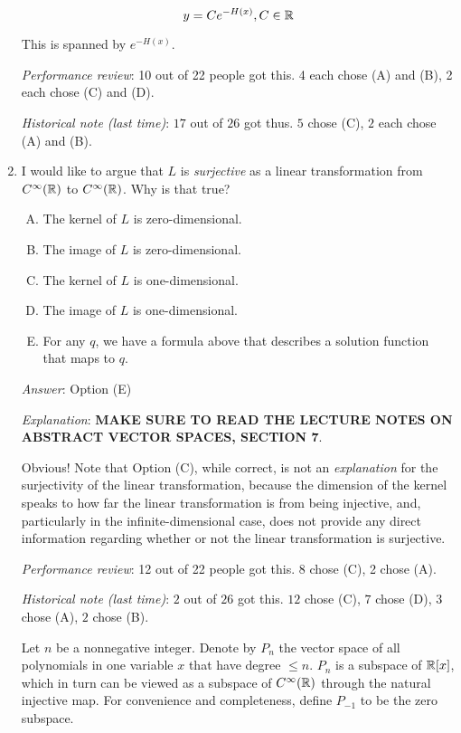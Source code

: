\documentclass[10pt]{amsart}
\begin{document}
\begin{enumerate}
  $$y = Ce^{-H(x)}, C \in \mathbb{R}$$

  This is spanned by $e^{-H(x)}$.

  {\em Performance review}: 10 out of 22 people got this. 4 each
  chose (A) and (B), 2 each chose (C) and (D).

  {\em Historical note (last time)}: $17$ out of $26$ got thus. $5$ chose (C),
  $2$ each chose (A) and (B).

\item I would like to argue that $L$ is {\em surjective} as a linear
  transformation from $C^\infty(\mathbb{R})$ to $C^\infty(\mathbb{R})$. Why is that
  true?

  \begin{enumerate}[(A)]
  \item The kernel of $L$ is zero-dimensional.
  \item The image of $L$ is zero-dimensional.
  \item The kernel of $L$ is one-dimensional.
  \item The image of $L$ is one-dimensional.
  \item For any $q$, we have a formula above that describes a solution
    function that maps to $q$.
  \end{enumerate}

  {\em Answer}: Option (E)

  {\em Explanation}: {\bf MAKE SURE TO READ THE LECTURE NOTES ON
    ABSTRACT VECTOR SPACES, SECTION 7}.

  Obvious! Note that Option (C), while correct, is
  not an {\em explanation} for the surjectivity of the linear
  transformation, because the dimension of the kernel speaks to how
  far the linear transformation is from being injective, and,
  particularly in the infinite-dimensional case, does not provide any
  direct information regarding whether or not the linear
  transformation is surjective.

  {\em Performance review}: 12 out of 22 people got this. 8 chose (C),
  2 chose (A).

  {\em Historical note (last time)}: $2$ out of $26$ got this. $12$ chose (C),
  $7$ chose (D), $3$ chose (A), $2$ chose (B).

  \vspace{0.6in}

  Let $n$ be a nonnegative integer. Denote by $P_n$ the vector space
  of all polynomials in one variable $x$ that have degree $\le
  n$. $P_n$ is a subspace of $\mathbb{R}[x]$, which in turn can be viewed as a
  subspace of $C^\infty(\mathbb{R})$ through the natural injective map. For
  convenience and completeness, define $P_{-1}$ to be the zero
  subspace.


\end{enumerate}
\end{document}
